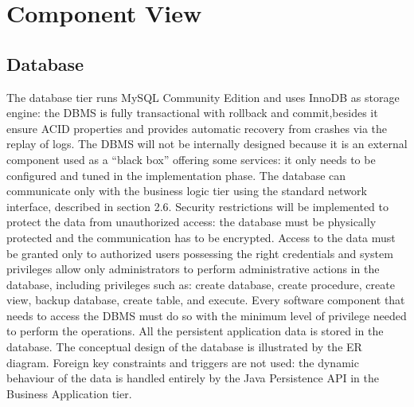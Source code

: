 \section{Component View}
\subsection{Database}
The database tier runs MySQL Community Edition and uses InnoDB as storage engine: the DBMS is fully transactional with rollback and commit,besides it ensure ACID properties and provides automatic recovery from crashes via the replay of logs. The DBMS will not be internally designed because it is an external component used as a “black box” offering some services: it only needs to be configured and tuned in the implementation phase. The database can communicate only with the business logic tier using the standard network interface, described in section 2.6. Security restrictions will be implemented to protect the data from unauthorized access: the database must be physically protected and the communication has to be encrypted. Access to the data must be granted only to authorized users possessing the right credentials and system privileges allow only administrators to perform administrative actions in the database, including privileges such as: create database, create procedure, create view, backup database, create table, and execute. Every software component that needs to access the DBMS must do so with the minimum level of privilege needed to perform the operations. All the persistent application data is stored in the database. The conceptual design of the database is illustrated by the ER diagram. Foreign key constraints and triggers are not used: the dynamic behaviour of the data is handled entirely by the Java Persistence API in the Business Application tier.



